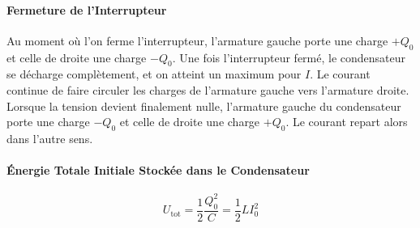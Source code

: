 \begin{multicols*}{2}
\begin{center}
    \end{center}
    
    \paragraph{Fermeture de l'Interrupteur}
    Au moment où l'on ferme l'interrupteur, l'armature gauche porte une charge $+Q_0$ et celle de droite une charge $-Q_0$. Une fois l'interrupteur fermé, le condensateur se décharge complètement, et on atteint un maximum pour $I$. Le courant continue de faire circuler les charges de l'armature gauche vers l'armature droite. Lorsque la tension devient finalement nulle, l'armature gauche du condensateur porte une charge $-Q_0$ et celle de droite une charge $+Q_0$. Le courant repart alors dans l'autre sens.
    
    \paragraph{Énergie Totale Initiale Stockée dans le Condensateur}
    \[ U_{\text{tot}} = \frac{1}{2} \frac{Q_0^2}{C} = \frac{1}{2} LI_0^2 \]
    
\end{multicols*}